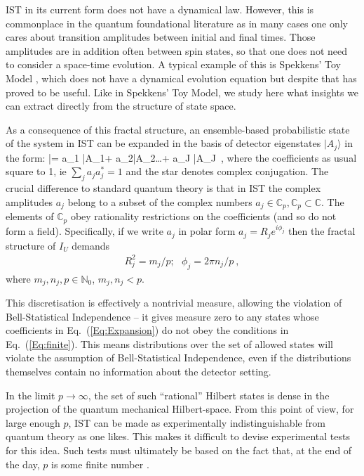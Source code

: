 \documentclass{article}
\makeatletter
\newcommand\be{\@ifstar{\[}{\begin{equation}}}
\newcommand\ee{\@ifstar{\]}{\end{equation}}}
\makeatother
\begin{document}
{\sc IST} in its current form does not have a dynamical law. However, this is commonplace in the quantum foundational literature as in many cases one only cares about transition amplitudes between initial and final times. Those amplitudes are in addition often between spin states, so that one does not need to consider a space-time evolution. A typical example of this is Spekkens' Toy Model \mbox{\cite{Spekkens2007Evidence}}, which does not have a dynamical evolution equation but despite that has proved to be useful. Like in Spekkens' Toy Model, we study here what insights we can extract directly from the structure of state space.

As a consequence of this fractal structure, an ensemble-based probabilistic state of the system in {\sc IST} can be expanded in the basis of detector eigenstates $|A_j \rangle$ in the form:
\be\label{Eq:Expansion}
|\psi\rangle = a_1 |A_1\rangle + a_2|A_2\rangle \ldots + a_J |A_J\rangle~,
\ee
where the coefficients as usual square to 1, ie $\sum_j a_j a^*_j =1$ and the star denotes complex conjugation.
The crucial difference to standard quantum theory is that in {\sc IST} the complex amplitudes $a_j$ belong to a subset of the complex numbers $a_j \in \mathbb C_p, \mathbb C_p \subset \mathbb C$. The elements of $\mathbb C_p$ obey rationality restrictions on the coefficients (and so do not form a field). Specifically, if we write $a_j$ in polar form $a_j=R_j e^{i \phi_j}$ then the fractal structure of $I_U$ demands
\begin{eqnarray}
\label{Eq:finite}
R^2_j=m_j/p; \ \ \ 
\phi_j = 2\pi n_j/p~,
\end{eqnarray}
where $m_j,n_j,p \in {\mathbb N}_0$, $m_j,n_j < p$.

This discretisation is effectively a nontrivial measure, allowing the violation of Bell-Statistical Independence -- it gives measure zero to any states whose coefficients in Eq.\ (\ref{Eq:Expansion}) do not obey the conditions in Eq.\ (\mbox{\ref{Eq:finite}}). This means distributions over the set of allowed states will violate the assumption of Bell-Statistical Independence, even if the distributions themselves contain no information about the detector setting.

In the limit $p \rightarrow \infty$, the set of such ``rational'' Hilbert states is dense in the projection of the quantum mechanical Hilbert-space. From this point of view, for large enough $p$, {\sc IST} can be made as experimentally indistinguishable from quantum theory as one likes. This makes it difficult to devise experimental tests for this idea. Such tests must ultimately be based on the fact that, at the end of the day, $p$ is some finite number \cite{Hance2021ExpIST}. 
\end{document}
